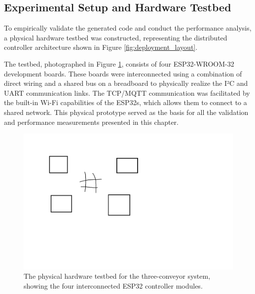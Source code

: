 
\subsection{Experimental Setup and Hardware Testbed}
\label{subsec:hardware_setup}

To empirically validate the generated code and conduct the performance analysis, a physical hardware testbed was constructed, representing the distributed controller architecture shown in Figure \ref{fig:deployment_layout}. 

The testbed, photographed in Figure \ref{fig:hardware_photo}, consists of four ESP32-WROOM-32 development boards. These boards were interconnected using a combination of direct wiring and a shared bus on a breadboard to physically realize the I²C and UART communication links. The TCP/MQTT communication was facilitated by the built-in Wi-Fi capabilities of the ESP32s, which allows them to connect to a shared network. This physical prototype served as the basis for all the validation and performance measurements presented in this chapter.

\begin{figure}[htb!]
    \centering
    \includegraphics[width=0.9\columnwidth]{Chapters/Figures/photo_of_setup.png}
    \caption{The physical hardware testbed for the three-conveyor system, showing the four interconnected ESP32 controller modules.}
    \label{fig:hardware_photo}
\end{figure}

